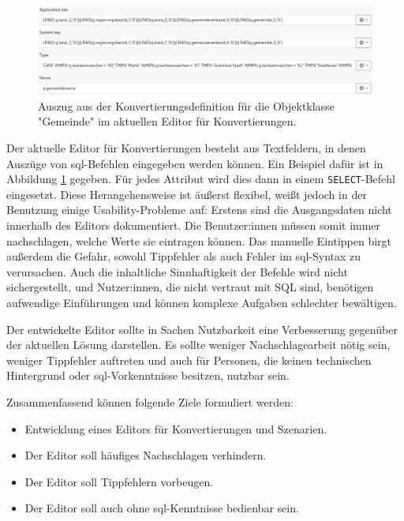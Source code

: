 \begin{figure}[ht]
  \centering
  \includegraphics[width=.95\textwidth]{assets/conversion-gemeinde.png}
  \caption{Auszug aus der Konvertierungsdefinition für die Objektklasse "Gemeinde" im aktuellen Editor für Konvertierungen.}
  \label{fig:conversion-gemeinde}
\end{figure}

Der aktuelle Editor für Konvertierungen besteht aus Textfeldern, in denen Auszüge von \ac{sql}-Befehlen eingegeben werden können. Ein Beispiel dafür ist in Abbildung \ref{fig:conversion-gemeinde} gegeben. Für jedes Attribut wird dies dann in einem \texttt{SELECT}-Befehl eingesetzt. Diese Herangehensweise ist äußerst flexibel, weißt jedoch in der Benutzung einige Usability-Probleme auf: Erstens sind die Ausgangsdaten nicht innerhalb des Editors dokumentiert. Die Benutzer:innen müssen somit immer nachschlagen, welche Werte sie eintragen können. Das manuelle Eintippen birgt außerdem die Gefahr, sowohl Tippfehler als auch Fehler im \ac{sql}-Syntax zu verursachen. Auch die inhaltliche Sinnhaftigkeit der Befehle wird nicht sichergestellt, und Nutzer:innen, die nicht vertraut mit SQL sind, benötigen aufwendige Einführungen und können komplexe Aufgaben schlechter bewältigen. 

Der entwickelte Editor sollte in Sachen Nutzbarkeit eine Verbesserung gegenüber der aktuellen Lösung darstellen. Es sollte weniger Nachschlagearbeit nötig sein, weniger Tippfehler auftreten und auch für Personen, die keinen technischen Hintergrund oder \ac{sql}-Vorkenntnisse besitzen, nutzbar sein.

Zusammenfassend können folgende Ziele formuliert werden:
\begin{itemize}
  \item Entwicklung eines Editors für Konvertierungen und Szenarien.
  \item Der Editor soll häufiges Nachschlagen verhindern.
  \item Der Editor soll Tippfehlern vorbeugen.
  \item Der Editor soll auch ohne \ac{sql}-Kenntnisse bedienbar sein.
\end{itemize}
